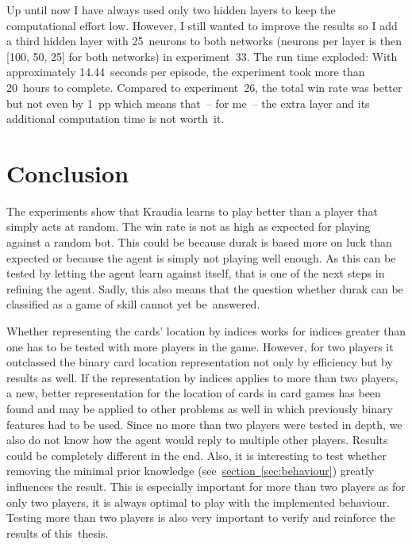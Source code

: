 \documentclass[a4paper,titlepage]{article}
\begin{document}
Up until now I have always used only two hidden layers to keep the computational effort low. However, I still wanted to improve the results so I add a third hidden layer with 25~neurons to both networks (neurons per layer is then [100, 50, 25] for both networks) in experiment~33. The run time exploded: With approximately 14.44~seconds per episode, the experiment took more than 20~hours to complete. Compared to experiment~26, the total win rate was better but not even by 1~pp which means that~-- for me~-- the extra layer and its additional computation time is not worth~it.

\newpage

\section{Conclusion}

The experiments show that Kraudia learns to play better than a player that simply acts at random. The win rate is not as high as expected for playing against a random bot. This could be because durak is based more on luck than expected or because the agent is simply not playing well enough. As this can be tested by letting the agent learn against itself, that is one of the next steps in refining the agent. Sadly, this also means that the question whether durak can be classified as a game of skill cannot yet be~answered.

Whether representing the cards' location by indices works for indices greater than one has to be tested with more players in the game. However, for two players it outclassed the binary card location representation not only by efficiency but by results as well. If the representation by indices applies to more than two players, a new, better representation for the location of cards in card games has been found and may be applied to other problems as well in which previously binary features had to be used. Since no more than two players were tested in depth, we also do not know how the agent would reply to multiple other players. Results could be completely different in the end. Also, it is interesting to test whether removing the minimal prior knowledge (see~\hyperref[sec:behaviour]{section~\ref*{sec:behaviour}}) greatly influences the result. This is especially important for more than two players as for only two players, it is always optimal to play with the implemented behaviour. Testing more than two players is also very important to verify and reinforce the results of this~thesis.
\end{document}
